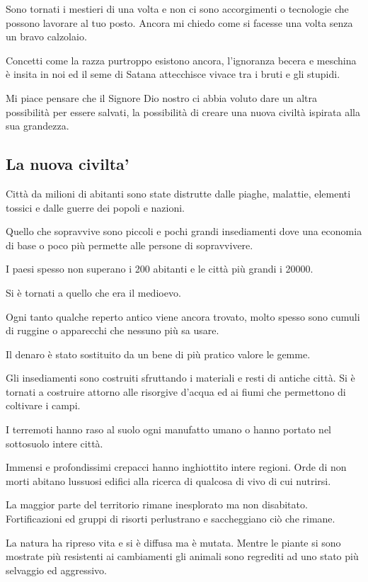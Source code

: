 \documentclass[a4paper,twoside,openany]{book}
\begin{document}
\begin{multicols}{2}
Sono tornati i mestieri di una volta e non ci sono accorgimenti o tecnologie che possono lavorare al tuo posto. Ancora mi chiedo come si facesse una volta senza un bravo calzolaio.

Concetti come la razza purtroppo esistono ancora, l'ignoranza becera e meschina è insita in noi ed il seme di Satana attecchisce vivace tra i bruti e gli stupidi.

Mi piace pensare che il Signore Dio nostro ci abbia voluto dare un altra possibilità per essere salvati, la possibilità di creare una nuova civiltà ispirata alla sua grandezza.

\subsection{La nuova civilta'}

Città da milioni di abitanti sono state distrutte dalle piaghe, malattie, elementi tossici e dalle guerre dei popoli e nazioni.

Quello che sopravvive sono piccoli e pochi grandi insediamenti dove una economia di base o poco più permette alle persone di sopravvivere.

I paesi spesso non superano i 200 abitanti e le città più grandi i 20000.

Si è tornati a quello che era il medioevo.

Ogni tanto qualche reperto antico viene ancora trovato, molto spesso sono cumuli di ruggine o apparecchi che nessuno più sa usare.

Il denaro è stato sostituito da un bene di più pratico valore le gemme.

Gli insediamenti sono costruiti sfruttando i materiali e resti di antiche città. Si è tornati a costruire attorno alle risorgive d'acqua ed ai fiumi che permettono di coltivare i campi.

I terremoti hanno raso al suolo ogni manufatto umano o hanno portato nel sottosuolo intere città.

Immensi e profondissimi crepacci hanno inghiottito intere regioni. Orde di non morti abitano lussuosi edifici alla ricerca di qualcosa di vivo di cui nutrirsi.

La maggior parte del territorio rimane inesplorato ma non disabitato. Fortificazioni ed gruppi di risorti perlustrano e saccheggiano ciò che rimane.

La natura ha ripreso vita e si è diffusa ma è mutata. Mentre le piante si sono mostrate più resistenti ai cambiamenti gli animali sono regrediti ad uno stato più selvaggio ed aggressivo.


\end{multicols}
\end{document}
